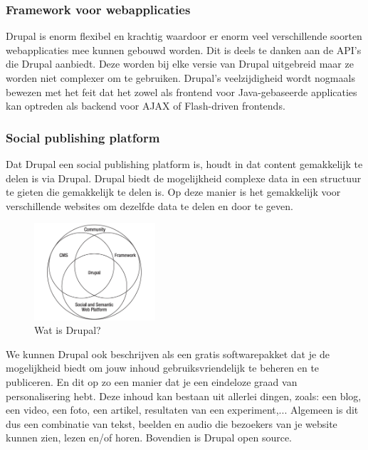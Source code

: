 \subsubsection{Framework voor webapplicaties}

Drupal is enorm flexibel en krachtig waardoor er enorm veel verschillende soorten webapplicaties mee kunnen gebouwd worden. Dit is deels te danken aan de API's die Drupal aanbiedt. Deze worden bij elke versie van Drupal uitgebreid maar ze worden niet complexer om te gebruiken. Drupal's veelzijdigheid wordt nogmaals bewezen met het feit dat het zowel als frontend voor Java-gebaseerde applicaties kan optreden als backend voor AJAX of Flash-driven frontends.

\subsubsection{Social publishing platform}

Dat Drupal een social publishing platform is, houdt in dat content gemakkelijk te delen is via Drupal. Drupal biedt de mogelijkheid complexe data in een structuur te gieten die gemakkelijk te delen is. Op deze manier is het gemakkelijk voor verschillende websites om dezelfde data te delen en door te geven.

\begin{figure}[h]
\centering
\includegraphics[width=0.4\textwidth]{fig/watIsDrupal}
\caption{Wat is Drupal?}
\vspace{-10pt}
\label{fig:watIsDrupal}
\end{figure}

We kunnen Drupal ook beschrijven als een gratis softwarepakket dat je de mogelijkheid biedt om jouw inhoud gebruiksvriendelijk te beheren en te publiceren. En dit op zo een manier dat je een eindeloze graad van personalisering hebt. Deze inhoud kan bestaan uit allerlei dingen, zoals: een blog, een video, een foto, een artikel, resultaten van een experiment,... Algemeen is dit dus een combinatie van tekst, beelden en audio die bezoekers van je website kunnen zien, lezen en/of horen. Bovendien is Drupal open source.

